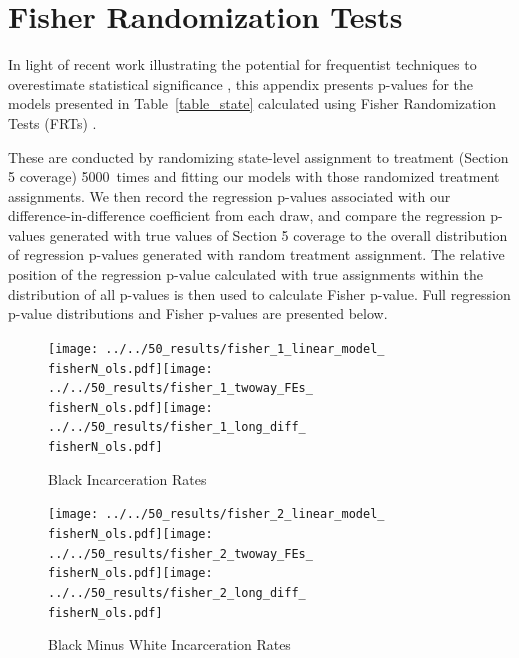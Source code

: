 \documentclass[12pt]{article}
\begin{document}
\section{Fisher Randomization Tests}\label{appendix_fisher}
\setcounter{table}{0}
\setcounter{figure}{0}
\renewcommand{\thetable}{J\arabic{table}}
\renewcommand{\thefigure}{J\arabic{figure}}
\normalsize

\newcommand{\fisherN}{5000}

In light of recent work illustrating the potential for frequentist techniques to overestimate statistical significance \citep{Young:2019jx}, this appendix presents p-values for the models presented in Table~\ref{table_state} calculated using Fisher Randomization Tests (FRTs) \cite{Fisher:1935uc}.

These are conducted by randomizing state-level assignment to treatment (Section 5 coverage) \fisherN\ times and fitting our models with those randomized treatment assignments. We then record the regression p-values associated with our difference-in-difference coefficient from each draw, and compare the regression p-values generated with true values of Section 5 coverage to the overall distribution of regression p-values generated with random treatment assignment. The relative position of the regression p-value calculated with true assignments within the distribution of all p-values is then used to calculate Fisher p-value. Full regression p-value distributions and Fisher p-values are presented below.

\begin{figure}[bh!]
	\centering
	\caption{Black Incarceration Rates}\label{figure_fisher1}
	\texttt{[image: ../../50\_results/fisher\_1\_linear\_model\_\\fisherN\_ols.pdf]}\texttt{[image: ../../50\_results/fisher\_1\_twoway\_FEs\_\\fisherN\_ols.pdf]}\texttt{[image: ../../50\_results/fisher\_1\_long\_diff\_\\fisherN\_ols.pdf]}
\end{figure}


\begin{figure}[bh!]
	\centering
	\caption{Black Minus White Incarceration Rates}\label{figure_fisher2}
	\texttt{[image: ../../50\_results/fisher\_2\_linear\_model\_\\fisherN\_ols.pdf]}\texttt{[image: ../../50\_results/fisher\_2\_twoway\_FEs\_\\fisherN\_ols.pdf]}\texttt{[image: ../../50\_results/fisher\_2\_long\_diff\_\\fisherN\_ols.pdf]}
\end{figure}
\end{document}

